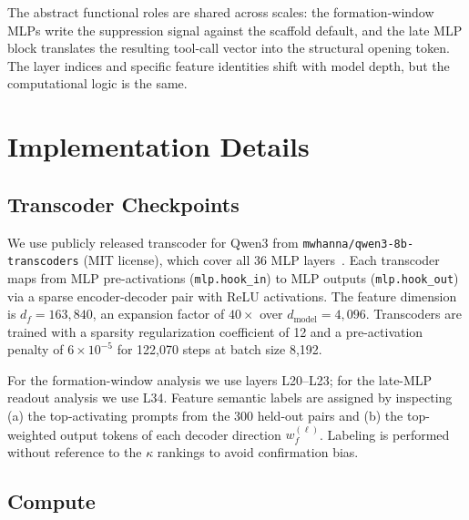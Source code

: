 The abstract functional roles are shared across scales: the formation-window
MLPs write the suppression signal against the scaffold default, and the late
MLP block translates the resulting tool-call vector into the structural opening
token. The layer indices and specific feature identities shift with model
depth, but the computational logic is the same.

\section{Implementation Details}
\label{appendix:implementation}

\subsection{Transcoder Checkpoints}
\label{appendix:implementation:transcoder}

We use publicly released transcoder for Qwen3 from
\texttt{mwhanna/qwen3-8b-transcoders} (MIT license), which cover all 36 MLP
layers~\citep{dunefsky2024transcoders}.
Each transcoder maps from MLP pre-activations (\texttt{mlp.hook\_in}) to MLP
outputs (\texttt{mlp.hook\_out}) via a sparse encoder-decoder pair with ReLU
activations.
The feature dimension is $d_f = 163{,}840$, an expansion factor of $40{\times}$
over $d_{\mathrm{model}} = 4{,}096$.
Transcoders are trained with a sparsity regularization coefficient of 12
and a pre-activation penalty of $6 \times 10^{-5}$ for 122,070 steps at
batch size 8,192.

For the formation-window analysis we use layers L20--L23; for the late-MLP
readout analysis we use L34.
Feature semantic labels are assigned by inspecting (a) the top-activating
prompts from the 300 held-out pairs and (b) the top-weighted output tokens of
each decoder direction $w_f^{(\ell)}$.
Labeling is performed without reference to the $\kappa$ rankings to avoid
confirmation bias.

\subsection{Compute}
\label{appendix:implementation:compute}

